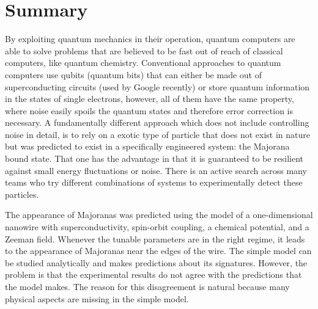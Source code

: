 \chapter*{Summary}

By exploiting quantum mechanics in their operation, quantum computers are able to solve problems that are believed to be fast out of reach of classical computers, like quantum chemistry.
Conventional approaches to quantum computers use qubits (quantum bits) that can either be made out of superconducting circuits (used by Google recently) or store quantum information in the states of single electrons, however, all of them have the same property, where noise easily spoils the quantum states and therefore error correction is necessary.
A fundamentally different approach which does not include controlling noise in detail, is to rely on a exotic type of particle that does not exist in nature but was predicted to exist in a specifically engineered system: the Majorana bound state.
That one has the advantage in that it is guaranteed to be resilient against small energy fluctuations or noise.
There is an active search across many teams who try different combinations of systems to experimentally detect these particles.


The appearance of Majoranas was predicted using the model of a one-dimensional nanowire with superconductivity, spin-orbit coupling, a chemical potential, and a Zeeman field.
Whenever the tunable parameters are in the right regime, it leads to the appearance of Majoranas near the edges of the wire.
The simple model can be studied analytically and makes predictions about its signatures.
However, the problem is that the experimental results do not agree with the predictions that the model makes.
The reason for this disagreement is natural because many physical aspects are missing in the simple model.

